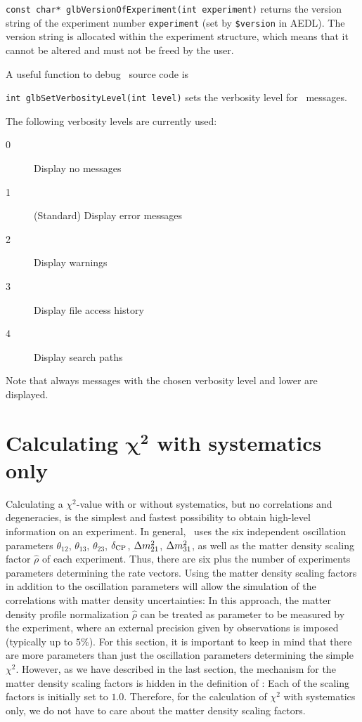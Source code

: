 \begin{function}
{\tt const char* glbVersionOfExperiment(int experiment)} returns
the version string of the experiment number {\tt experiment} (set by
{\tt \$version} in AEDL).
The version string is allocated within the experiment structure, which means
that it cannot be altered and must not be freed by the
user.
\end{function}
%
A useful function to debug \GLOBES\ source code is 
\begin{function}
{\tt int glbSetVerbosityLevel(int level)} sets the verbosity level
for \GLOBES\ messages.
\end{function}
The following verbosity levels are currently used:
\begin{description}
\item[0] Display no messages
\item[1] (Standard) Display error messages
\item[2] Display warnings
\item[3] Display file access history
\item[4] Display search paths
\end{description}
Note that always messages with the chosen verbosity level and lower
are displayed.

\chapter[Calculating $\chi^2$ with systematics only]{Calculating $\boldsymbol{\chi^2}$ with systematics only}

Calculating a $\chi^2$-value with or without systematics, but no correlations and degeneracies, is the simplest and fastest possibility to obtain high-level information on an experiment. In general, \GLOBES\ uses the six independent oscillation parameters $\theta_{12}$, $\theta_{13}$, $\theta_{23}$, $\delta_{\mathrm{CP}}$, $\Delta m_{21}^2$, $\Delta m_{31}^2$, as well as the matter density 
scaling factor $\hat{\rho}$ of each experiment. Thus, there are six plus the number of experiments parameters determining the rate vectors. Using the matter density scaling factors  in addition to the oscillation parameters will allow the simulation of the correlations with matter density uncertainties: In this
approach, the matter density profile normalization $\hat{\rho}$ can 
be treated
as parameter to be measured by the experiment, where an external precision
given by observations is imposed (typically up to $5\%$). 
 For this section, it is important to keep in mind
that there are more parameters than just the oscillation parameters
determining the simple $\chi^2$. However, as we have described in the
last section, the mechanism for the matter density scaling factors
is hidden in the definition of : Each of the scaling
factors is initially set to $1.0$. Therefore, for the calculation of
$\chi^2$ with systematics only, we do not have to care about the
matter density scaling factors.

